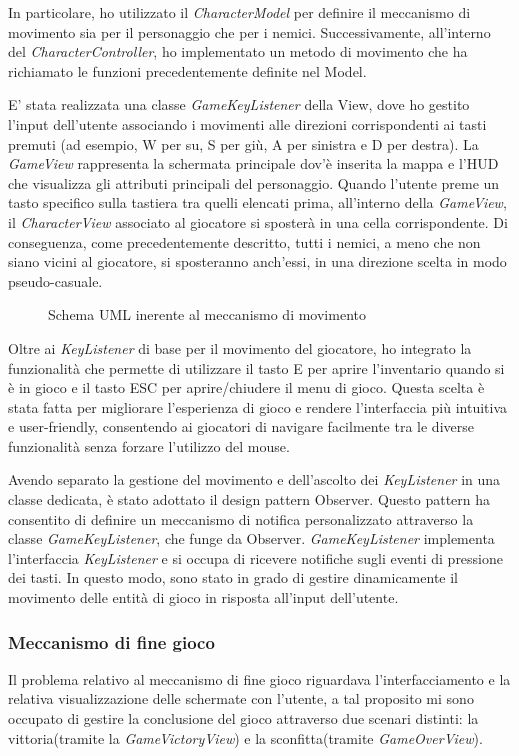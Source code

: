 \documentclass[a4paper,12pt]{report}
\begin{document}
In particolare, ho utilizzato il \textit{CharacterModel} per definire il meccanismo di movimento sia per il personaggio che per i nemici. Successivamente, all'interno del \textit{CharacterController}, ho implementato un metodo di movimento che ha richiamato le funzioni precedentemente definite nel Model. 

E' stata realizzata una classe \textit{GameKeyListener} della View, dove ho gestito l'input dell'utente associando i movimenti alle direzioni corrispondenti ai tasti premuti (ad esempio, W per su, S per giù, A per sinistra e D per	destra). La \textit{GameView} rappresenta la schermata principale dov'è inserita la mappa e l'HUD che visualizza gli attributi principali del personaggio.
Quando l'utente preme un tasto specifico sulla tastiera tra quelli elencati prima, all'interno della \textit{GameView}, il \textit{CharacterView} associato al giocatore si sposterà in una cella corrispondente. Di conseguenza, come precedentemente descritto, tutti i nemici, a meno che non siano vicini al giocatore, si sposteranno anch'essi, in una direzione scelta in modo pseudo-casuale.

\begin{figure}[H]
	\centering
	
	\caption{Schema UML inerente al meccanismo di movimento}
	\label{fig:the-exiled-movement-uml}
\end{figure}

Oltre ai \textit{KeyListener} di base per il movimento del giocatore, ho integrato la funzionalità che permette di utilizzare il tasto E per aprire l'inventario quando si è in gioco e il tasto ESC per aprire/chiudere il menu di gioco. Questa scelta è stata fatta per migliorare l'esperienza di gioco e rendere l'interfaccia più intuitiva e user-friendly, consentendo ai giocatori di navigare facilmente tra le diverse funzionalità senza forzare l'utilizzo del mouse.

Avendo separato la gestione del movimento e dell'ascolto dei \textit{KeyListener} in una classe dedicata, è stato adottato il design pattern Observer. Questo pattern ha consentito di definire un meccanismo di notifica personalizzato attraverso la classe \textit{GameKeyListener}, che funge da Observer. \textit{GameKeyListener} implementa l'interfaccia \textit{KeyListener} e si occupa di ricevere notifiche sugli eventi di pressione dei tasti. In questo modo, sono stato in grado di gestire dinamicamente il movimento delle entità di gioco in risposta all'input dell'utente.

\subsubsection{Meccanismo di fine gioco}
Il problema relativo al meccanismo di fine gioco riguardava l'interfacciamento e la relativa visualizzazione delle schermate con l'utente, a tal proposito mi sono occupato di gestire la conclusione del gioco attraverso due scenari distinti: la vittoria(tramite la \textit{GameVictoryView}) e la sconfitta(tramite \textit{GameOverView}).
\end{document}
